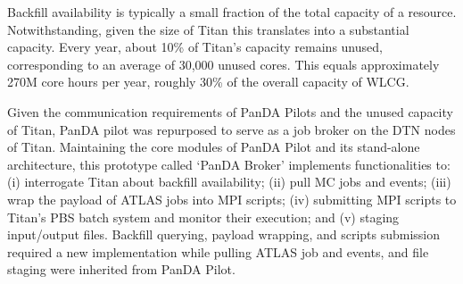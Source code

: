 Backfill availability is typically a small fraction of the total capacity  of
a resource. Notwithstanding,  given the size of Titan this translates into a
substantial capacity. Every year, about 10\% of Titan's capacity remains
unused, corresponding to an average of 30,000 unused cores. This equals
approximately 270M core hours per year, roughly 30\% of the overall capacity
of WLCG.



Given the communication requirements of PanDA Pilots and the unused capacity of
Titan, PanDA pilot was repurposed to serve as a job broker on the DTN nodes of
Titan. Maintaining the core modules of PanDA Pilot and its stand-alone
architecture, this prototype called `PanDA Broker' implements functionalities
to: (i) interrogate Titan about backfill availability; (ii) pull MC jobs and
events; (iii) wrap the payload of ATLAS jobs into MPI scripts; (iv) submitting
MPI scripts to Titan's PBS batch system and monitor their execution; and (v)
staging input/output files. Backfill querying, payload wrapping, and scripts
submission required a new implementation while pulling ATLAS job and events, and
file staging were inherited from PanDA Pilot.


